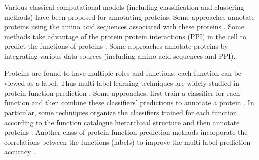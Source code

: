 \documentclass{llncs} %
\begin{document}
Various classical computational models (including classification and clustering methods) have been proposed for annotating proteins. Some approaches annotate proteins using the amino acid sequences associated with these proteins \cite{elisseeff2001kernel,leslie2004mismatch}. Some methods take advantage of the protein protein interactions (PPI) in the cell to predict the functions of proteins \cite{becker2012multifunctional,sharan2007network}. Some approaches annotate proteins by integrating various data sources (including amino acid sequences and PPI)\cite{mostafavi2010fast,tsuda2005fast}.

Proteins are found to have multiple roles and functions; each function can be viewed as a label. Thus multi-label learning techniques are widely studied in protein function prediction \cite{elisseeff2001kernel,tsoumakas2010mining}. Some approaches, first train a classifier for each function and then combine these classifiers' predictions to annotate a protein \cite{leslie2004mismatch}. In particular, some techniques organize the classifiers trained for each function according to the function catalogue hierarchical structure \cite{ashburner2000gene,ruepp2004funcat} and then annotate proteins \cite{barutcuoglu2006hierarchical,cesa2011synergy}. Another
class of protein function  prediction methods incorporate the correlations between the functions (labels) to improve the
multi-label prediction accuracy \cite{jiang2011predicting,zhang2011framework}.
\end{document}
